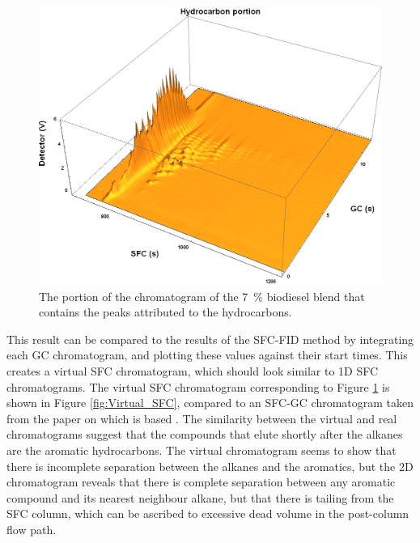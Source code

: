 \begin{figure}
	\centering
	\includegraphics[width=\textwidth]{Figures/Hydrocarbons_Portion.png}
	\decoRule	
	
\caption[Hydrocarbons in RME/diesel blend.]{The portion of the chromatogram of the
\SI{7}{\percent} biodiesel blend that contains the peaks attributed to the hydrocarbons.}
	
	\label{fig:Hydrocarbons_Portion} 
\end{figure}

This result can be compared to the results of the SFC-FID method by integrating
each \twoD GC chromatogram, and plotting these values against their start times.
This creates a virtual SFC chromatogram, which should look similar to 1D SFC
chromatograms. The virtual SFC chromatogram corresponding to Figure
\ref{fig:Hydrocarbons_Portion} is shown in Figure \ref{fig:Virtual_SFC},
compared to an SFC-GC chromatogram taken from the paper on which 
is based \autocite{DiSanzo1991}. The similarity between the virtual and real
chromatograms suggest that the compounds that elute shortly after the
alkanes are the aromatic hydrocarbons. The virtual chromatogram seems to show
that there is incomplete separation between the alkanes and the aromatics, but
the 2D chromatogram reveals that there is complete separation between any aromatic
compound and its nearest neighbour alkane, but that there is tailing from the
SFC column, which can be ascribed to excessive dead volume in the post-column
flow path.

